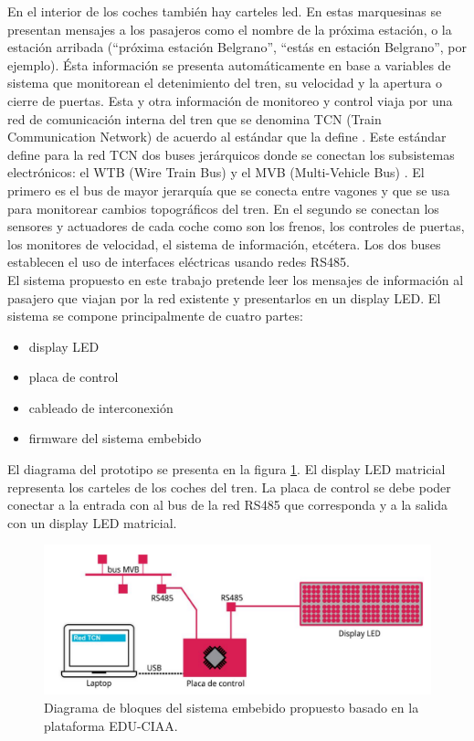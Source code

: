 En el interior de los coches también hay carteles led. En estas marquesinas se presentan mensajes a los pasajeros como el nombre de la próxima estación, o la estación arribada (“próxima estación Belgrano”, “estás en estación Belgrano”, por ejemplo). Ésta información se
presenta automáticamente en base a variables de sistema que monitorean el detenimiento del tren, su velocidad y la apertura o cierre de puertas. Esta y otra información de monitoreo y control viaja por una red de comunicación interna del tren que se denomina TCN (Train Communication Network) de acuerdo al estándar que la define \citep{IEC-61375-1}. Este estándar define para la red TCN dos buses jerárquicos donde se conectan los subsistemas electrónicos: el WTB (Wire Train Bus) y el MVB (Multi-Vehicle Bus) \citep{CSN EN 61375-2-1}\citep{IEC 61375-3-1:2012}. El primero es el bus de mayor jerarquía que se conecta entre vagones y que se usa para monitorear cambios topográficos del tren. En el segundo se conectan los sensores y actuadores de cada coche como son los frenos, los controles de puertas, los monitores de velocidad, el sistema de información, etcétera. Los dos buses establecen el uso de interfaces eléctricas usando redes RS485.\\


 El sistema propuesto en este trabajo pretende leer los mensajes de información al pasajero que viajan por la red existente y presentarlos en un display LED. El sistema se compone principalmente de cuatro partes:
 \begin{itemize}
\item display LED
\item placa de control
\item cableado de interconexión
\item firmware del sistema embebido
 \end{itemize}

El diagrama del prototipo se presenta en la figura \ref{fig:diagramaPIDSCIAA}. El display LED matricial representa los carteles de los coches del tren. La placa de control se debe poder conectar a la entrada con al bus de la red RS485 que corresponda y a la salida con un display LED matricial.

\begin{figure}[ht]
	\centering
	\includegraphics[width=1\textwidth]{./Figures/diagramaPIDSCIAA.png}
	\caption{Diagrama de bloques del sistema embebido propuesto basado en la plataforma EDU-CIAA.}
	\label{fig:diagramaPIDSCIAA}
\end{figure}


